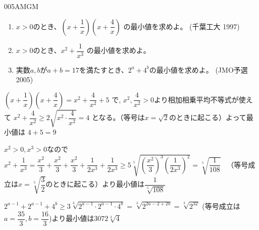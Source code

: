 \begin{prob}{005}{}{AMGM}
 \begin{enumerate}
  \item $x>0$のとき、$\left(x+\dfrac{1}{x}\right)\left(x+\dfrac{4}{x}\right)$ の最小値を求めよ。 (千葉工大 1997)
  \item $x>0$のとき、$x^2+\dfrac{1}{x^3}$ の最小値を求めよ。
  \item 実数$a,b$が$a+b=17$を満たすとき、$2^a+4^b$の最小値を求めよ。 (JMO予選 2005)
 \end{enumerate}
\end{prob}

$\left(x+\dfrac{1}{x}\right)\left(x+\dfrac{4}{x}\right)=x^2+\dfrac{4}{x^2}+5$ で, $x^2,\dfrac{4}{x^2}>0$より相加相乗平均不等式が使えて $x^2+\dfrac{4}{x^2}\geq 2\sqrt{x^2\cdot \dfrac{4}{x^2}}=4$ となる。（等号は$x=\sqrt{2}$のときに起こる）よって最小値は $4+5=9$

$x^2>0, x^3>0$なので$x^2+\dfrac{1}{x^3}=\dfrac{x^2}{3}+\dfrac{x^2}{3}+\dfrac{x^2}{3}+\dfrac{1}{2x^3}+\dfrac{1}{2x^3}\geq 5\sqrt[5]{\left(\dfrac{x^2}{3}\right)^3\left(\dfrac{1}{2x^3}\right)^2}=\sqrt[5]{\dfrac{1}{108}}$ 　（等号成立は$x=\sqrt[5]{\dfrac{3}{2}}$のときに起こる）より最小値は$\dfrac{1}{\sqrt[5]{108}}$

$2^{a-1}+2^{a-1}+4^b\geq 3\sqrt[3]{2^{a-1}\cdot 2^{a-1}\cdot 4^b}=\sqrt[3]{2^{2a-2+2b}}=\sqrt[3]{2^{32}}$ (等号成立は$a=\dfrac{35}{3}, b=\dfrac{16}{3}$)より最小値は$3072\sqrt[3]{4}$

